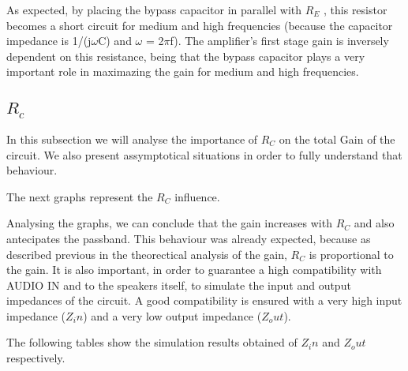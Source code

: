 As expected, by placing the bypass capacitor in parallel with $R_E$ , this resistor becomes a short circuit for medium and high frequencies (because the capacitor impedance is 1/(j$\omega$C) and $\omega$ = 2$\pi$f). The amplifier’s first stage gain is inversely dependent on this resistance, being that the bypass capacitor plays a very important role in maximazing the gain for medium and high frequencies.

\subsection{$R_c$}

In this subsection we will analyse the importance of $R_C$ on the total Gain of the circuit.
We also present assymptotical situations in order to fully understand that behaviour.

The next graphs represent the $R_C$ influence.


Analysing the graphs, we can conclude that the gain increases with $R_C$ and also antecipates the passband.
This behaviour was already expected, because as described previous in the theorectical analysis of the gain, $R_C$ is proportional to the gain.
It is also important, in order to guarantee a high compatibility with AUDIO IN and to the speakers itself, to simulate the input and output impedances of the circuit. 
A good compatibility is ensured with a very high input impedance ($Z_in$) and a very low output impedance ($Z_out$). \par 
The following tables show the simulation results obtained of $Z_in$ and $Z_out$ respectively.

%


